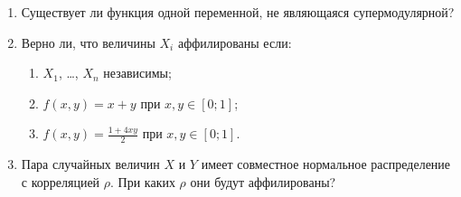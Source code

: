 \begin{enumerate}
\item Существует ли функция одной переменной, не являющаяся супермодулярной?

\item Верно ли, что величины $ X_{i} $ аффилированы если:

\begin{enumerate}
\item $ X_{1} $, \ldots, $ X_{n} $ независимы;
\item $ f(x,y)=x+y $ при $ x,y\in [0;1] $;
\item $ f(x,y)=\frac{1+4xy}{2} $ при $ x,y\in [0;1] $.
\end{enumerate}

\item Пара случайных величин $ X $ и $ Y $ имеет совместное нормальное распределение с корреляцией $ \rho $. При каких $ \rho $ они будут аффилированы?

\end{enumerate}


